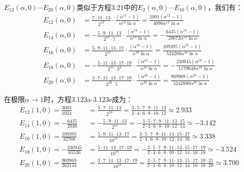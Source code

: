$E_{12}(\alpha, 0)\cdots E_{20}(\alpha, 0)$类似于方程3.21中的$E_{2}(\alpha, 0)\cdots E_{10}(\alpha, 0)$，我们有：
\begin{subequations}%
	\begin{align}
E_{12}(\alpha,0)&=\frac{7\cdot11\cdot13}{2^{12}}\cdot\frac{(\alpha^{12}-1)}{\alpha^{12}\ln\alpha}=\frac{1001(\alpha^{12}-1)}{4096\alpha^{12}\ln\alpha}\\
E_{14}(\alpha,0)&=-\frac{5\cdot9\cdot11\cdot13}{2^{12}\cdot7}\cdot\frac{(\alpha^{14}-1)}{\alpha^{14}\ln\alpha}=-\frac{6435(\alpha^{14}-1)}{28672\alpha^{14}\ln\alpha}\\
E_{16}(\alpha,0)&=\frac{5\cdot9\cdot11\cdot13\cdot17}{2^{19}}\cdot\frac{(\alpha^{16}-1)}{\alpha^{16}\ln\alpha}=\frac{109395(\alpha^{16}-1)}{524288\alpha^{16}\ln\alpha}\\
E_{18}(\alpha,0)&=-\frac{5\cdot11\cdot13\cdot17\cdot19}{2^{17}\cdot3^2}\cdot\frac{(\alpha^{18}-1)}{\alpha^{18}\ln\alpha}=-\frac{230945(\alpha^{18}-1)}{1179648\alpha^{18}\ln\alpha}\\
E_{20}(\alpha,0)&=\frac{3\cdot7\cdot11\cdot13\cdot17\cdot19}{2^{20}\cdot5}\cdot\frac{(\alpha^{20}-1)}{\alpha^{20}\ln\alpha}=\frac{969969(\alpha^{20}-1)}{5242880\alpha^{20}\ln\alpha}
\end{align}
\end{subequations}

在极限$\alpha\rightarrow 1$时，方程3.123a-3.123e成为：
\begin{subequations}
	\begin{align}
E_{12}(1,0)=\frac{3003}{1024}&=\frac{3\cdot7\cdot11\cdot13}{2^{10}}=\frac{3\cdot5\cdot7\cdot9\cdot11\cdot13}{2\cdot4\cdot6\cdot8\cdot10\cdot12}\simeq 2.933\\
E_{14}(1,0)=-\frac{6435}{2048}&=-\frac{5\cdot9\cdot11\cdot13}{2^{11}}=-\frac{3\cdot5\cdot7\cdot9\cdot11\cdot13\cdot15}{2\cdot4\cdot6\cdot8\cdot10\cdot12\cdot14}\simeq-3.142\\
E_{16}(1,0)=\frac{109395}{32768}&=\frac{5\cdot9\cdot11\cdot13\cdot17}{10^{15}}=\frac{3\cdot5\cdot7\cdot9\cdot11\cdot13\cdot15\cdot17} {2\cdot4\cdot6\cdot8\cdot10\cdot12\cdot14\cdot16}\simeq 3.338\\
E_{18}(1,0)=-\frac{230945}{65536}&=\frac{5\cdot11\cdot13\cdot17\cdot19}{10^{16}}=-\frac{3\cdot5\cdot7\cdot9\cdot11\cdot13\cdot15\cdot17\cdot19} {2\cdot4\cdot6\cdot8\cdot10\cdot12\cdot14\cdot16\cdot18}\simeq-3.524\\
E_{20}(1,0)=\frac{969969}{262144}&=\frac{3\cdot7\cdot11\cdot13\cdot17\cdot19}{10^{18}}=\frac{3\cdot5\cdot7\cdot9\cdot11\cdot13\cdot15\cdot17\cdot19\cdot21} {2\cdot4\cdot6\cdot8\cdot10\cdot12\cdot14\cdot16\cdot18\cdot20}\simeq 3.700
\end{align}
\end{subequations}

